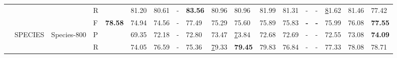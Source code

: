 \documentclass[nocrop]{bioinfo}
\begin{document}
\begin{landscape}
\begin{table}[]
\begin{tabular}{@{}lllllllllllllllllll@{}}
                                         & \multicolumn{2}{l}{}                              &                                  & R       &                & \multicolumn{1}{l|}{81.20}       & 80.61 & -          & \textbf{83.56} & 80.96                                                                      & 80.96                                                               & \multicolumn{1}{l|}{81.99}                                                            & 81.31       & -             & -              & {\ul 81.62}                                                                & 81.46                                                               & 77.42                                                            \\
                                         & \multicolumn{2}{l}{}                              &                                  & F       & \textbf{78.58} & \multicolumn{1}{l|}{74.94}       & 74.56 & -          & 77.49          & 75.29                                                                      & 75.60                                                               & \multicolumn{1}{l|}{75.89}                                                            & 75.83       & \textbf{-}    & \textbf{-}     & 75.99                                                                      & 76.08                                                               & \textbf{77.55}                                                   \\ \cmidrule(l){2-19} 
                                         & \multicolumn{2}{l}{\multirow{3}{*}{SPECIES}}      & \multirow{3}{*}{Species-800}     & P       &                & \multicolumn{1}{l|}{69.35}       & 72.18 & -          & 72.80          & 73.47                                                                      & {\ul 73.84}                                                         & \multicolumn{1}{l|}{72.68}                                                            & 72.69       & -             & -              & 72.55                                                                      & 73.08                                                               & \textbf{74.09}                                                   \\
                                         & \multicolumn{2}{l}{}                              &                                  & R       &                & \multicolumn{1}{l|}{74.05}       & 76.59 & -          & 75.36          & {\ul 79.33}                                                                & \textbf{79.45}                                                      & \multicolumn{1}{l|}{79.83}                                                            & 76.84       & -             & -              & 77.33                                                                      & 78.08                                                               & 78.71                                                            \\

\end{tabular}
\end{table}
\end{landscape}
\end{document}

